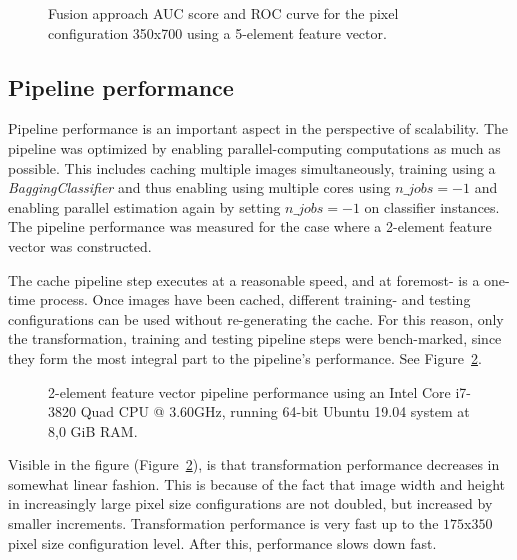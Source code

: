 \begin{figure}[ht]
  \centering
  
  \caption{Fusion approach AUC score and ROC curve for the pixel configuration 350x700 using a 5-element feature vector.
  }\label{fig:5-element-fv-fusion-aucroc}
\end{figure}

\subsection{Pipeline performance}\label{sec:pipeline-performance}
Pipeline performance is an important aspect in the perspective of scalability. The pipeline was optimized by enabling parallel-computing computations as much as possible. This includes caching multiple images simultaneously, training using a \textit{BaggingClassifier} and thus enabling using multiple cores using $n\_jobs=-1$ and enabling parallel estimation again by setting $n\_jobs=-1$ on classifier instances. The pipeline performance was measured for the case where a 2-element feature vector was constructed.

The cache pipeline step executes at a reasonable speed, and at foremost- is a one-time process. Once images have been cached, different training- and testing configurations can be used without re-generating the cache. For this reason, only the transformation, training and testing pipeline steps were bench-marked, since they form the most integral part to the pipeline's performance. See Figure~\ref{fig:pipeline-performance}.

\begin{figure}[ht]
  \centering
  
  \caption{2-element feature vector pipeline performance using an Intel Core i7-3820 Quad CPU @ 3.60GHz, running 64-bit Ubuntu 19.04 system at 8,0 GiB RAM.
  }\label{fig:pipeline-performance}
\end{figure}

Visible in the figure (Figure~\ref{fig:pipeline-performance}), is that transformation performance decreases in somewhat linear fashion. This is because of the fact that image width and height in increasingly large pixel size configurations are not doubled, but increased by smaller increments. Transformation performance is very fast up to the $175$x$350$ pixel size configuration level. After this, performance slows down fast.

